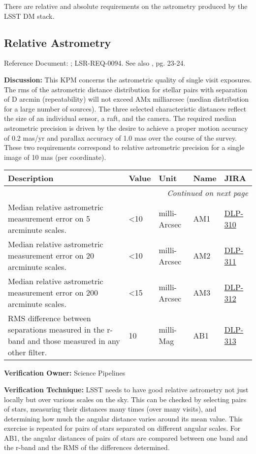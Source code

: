 \documentclass[DM,lsstdraft,toc]{lsstdoc}
\makeatletter
\newcommand{\jira}[1]{\href{https://jira.lsstcorp.org/browse/#1}{#1}}
\newenvironment{metric}[0]{%
\setlength\LTleft{0pt}
\setlength\LTright{\fill}
\begin{longtable}[]{@{}p{0.4\textwidth}lp{0.75in}p{1.3in}p{0.75in}@{}}

\hline \textbf{Description} & \textbf{Value} & \textbf{Unit} & \textbf{Name} & \textbf{JIRA} \\ \hline
\endhead

\hline \multicolumn{5}{r}{\emph{Continued on next page}} \\
\endfoot

\hline\hline
\endlastfoot
}{%
\hline
\end{longtable}
}
\makeatother
\begin{document}
There are relative and absolute requirements on the astrometry produced
by the LSST DM stack.

\subsection{Relative Astrometry}\label{relative-astrometry}

Reference Document: ; LSR-REQ-0094. See also \SRD, pg. 23-24.

\textbf{Discussion:} This KPM concerns the astrometric quality of single
visit exposures. The rms of the astrometric distance distribution for
stellar pairs with separation of D arcmin (repeatability) will not
exceed AMx milliarcsec (median distribution for a large number of
sources). The three selected characteristic distances reflect the size
of an individual sensor, a raft, and the camera. The required median
astrometric precision is driven by the desire to achieve a proper motion
accuracy of 0.2 mas/yr and parallax accuracy of 1.0 mas over the course
of the survey. These two requirements correspond to relative astrometric
precision for a single image of 10 mas (per coordinate).

\begin{metric}
Median relative astrometric measurement error on 5 arcminute scales. &
\textless{}10 & milli-Arcsec & AM1 & \jira{DLP-310}\tabularnewline
Median relative astrometric measurement error on 20 arcminute scales. &
\textless{}10 & milli-Arcsec & AM2 & \jira{DLP-311}\tabularnewline
Median relative astrometric measurement error on 200 arcminute scales. &
\textless{}15 & milli-Arcsec & AM3 & \jira{DLP-312}\tabularnewline
RMS difference between separations measured in the r-band and those
measured in any other filter. & 10 & milli-Mag & AB1 &
\jira{DLP-313}\tabularnewline
\end{metric}

\textbf{Verification Owner:} Science Pipelines

\textbf{Verification Technique:} LSST needs to have good relative
astrometry not just locally but over various scales on the sky. This can
be checked by selecting pairs of stars, measuring their distances many
times (over many visits), and determining how much the angular distance
varies around its mean value. This exercise is repeated for pairs of
stars separated on different angular scales. For AB1, the angular
distances of pairs of stars are compared between one band and the r-band
and the RMS of the differences determined.
\end{document}

